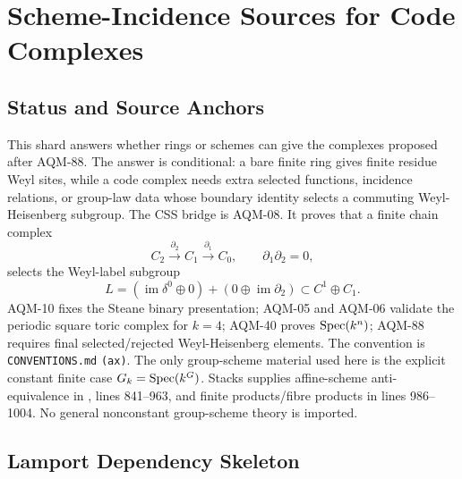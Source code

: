 
\section{Scheme-Incidence Sources for Code Complexes}
\label{sec:scheme-incidence-code-sources}

\subsection{Status and Source Anchors}
This shard answers whether rings or schemes can give the complexes proposed
after AQM-88.  The answer is conditional: a bare finite ring gives finite
residue Weyl sites, while a code complex needs extra selected functions,
incidence relations, or group-law data whose boundary identity selects a
commuting Weyl-Heisenberg subgroup.  The CSS bridge is AQM-08.  It proves that
a finite chain complex
\[
  C_2\xrightarrow{\partial_2}C_1\xrightarrow{\partial_1}C_0,
  \qquad \partial_1\partial_2=0,
\]
selects the Weyl-label subgroup
\[
  L=(\operatorname{im}\delta^0\oplus0)+(0\oplus\operatorname{im}\partial_2)
  \subset C^1\oplus C_1 .
\]
AQM-10 fixes the Steane binary presentation; AQM-05 and AQM-06 validate the
periodic square toric complex for \(k=4\); AQM-40 proves
\(\operatorname{Spec}(k^n)\); AQM-88 requires final selected/rejected Weyl-Heisenberg
elements.  The convention is \texttt{CONVENTIONS.md} \texttt{(ax)}.  The only
group-scheme material used here is the explicit constant finite case
\(G_k=\operatorname{Spec}(k^G)\).  Stacks supplies affine-scheme anti-equivalence in
, lines
841--963, and finite products/fibre products in lines 986--1004.  No general
nonconstant group-scheme theory is imported.

\subsection{Lamport Dependency Skeleton}

